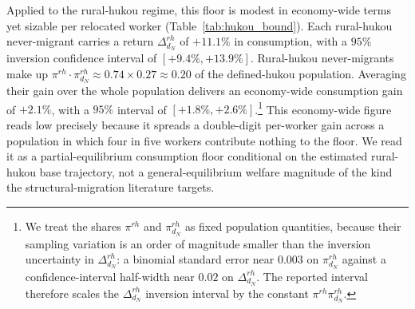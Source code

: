 Applied to the rural-hukou regime, this floor is modest in economy-wide terms yet sizable per relocated worker (Table~\ref{tab:hukou_bound}).
Each rural-hukou never-migrant carries a return $\Delta_{d_N}^{rh}$ of $+11.1\%$ in consumption, with a $95\%$ inversion confidence interval of $[+9.4\%, +13.9\%]$.
Rural-hukou never-migrants make up $\pi^{rh}\cdot\pi_{d_N}^{rh} \approx 0.74 \times 0.27 \approx 0.20$ of the defined-hukou population.
Averaging their gain over the whole population delivers an economy-wide consumption gain of $+2.1\%$, with a $95\%$ interval of $[+1.8\%, +2.6\%]$.\footnote{We treat the shares $\pi^{rh}$ and $\pi_{d_N}^{rh}$ as fixed population quantities, because their sampling variation is an order of magnitude smaller than the inversion uncertainty in $\Delta_{d_N}^{rh}$: a binomial standard error near $0.003$ on $\pi_{d_N}^{rh}$ against a confidence-interval half-width near $0.02$ on $\Delta_{d_N}^{rh}$. The reported interval therefore scales the $\Delta_{d_N}^{rh}$ inversion interval by the constant $\pi^{rh}\pi_{d_N}^{rh}$.}
This economy-wide figure reads low precisely because it spreads a double-digit per-worker gain across a population in which four in five workers contribute nothing to the floor.
We read it as a partial-equilibrium consumption floor conditional on the estimated rural-hukou base trajectory, not a general-equilibrium welfare magnitude of the kind the structural-migration literature targets.




